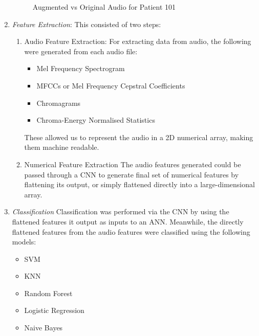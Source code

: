 \documentclass[10pt,twocolumn,letterpaper]{article}
\begin{document}
\begin{enumerate}
\begin{figure}[htbp]
        \caption{Augmented vs Original Audio for Patient 101}
        \label{fig:unhealhty}
    \end{figure}
    \item \textit{Feature Extraction}:
    This consisted of two steps:
    \begin{enumerate}
        \item Audio Feature Extraction: For extracting data from audio, the following were generated from each audio file:
        \begin{itemize}
            \item Mel Frequency Spectrogram
            \item MFCCs or Mel Frequency Cepstral Coefficients
            \item Chromagrams
            \item Chroma-Energy Normalised Statistics
        \end{itemize}
        These allowed us to represent the audio in a 2D numerical array, making them machine readable.
        \item Numerical Feature Extraction
        The audio features generated could be passed through a CNN to generate final set of numerical features by flattening its output, or simply flattened directly into a large-dimensional array.
    \end{enumerate}
    \item \textit{Classification}
    Classification was performed via the CNN by using the flattened features it output as inputs to an ANN. Meanwhile, the directly flattened features from the audio features were classified using the following models:
    \begin{itemize}
        \item SVM
        \item KNN
        \item Random Forest
        \item Logistic Regression
        \item Naive Bayes
    \end{itemize}
\end{enumerate}
\end{document}
